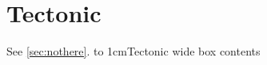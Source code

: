 \documentclass{article}
\begin{document}
\section{Tectonic}\label{sec:t}
See \ref{sec:nothere}.
\undefinedintectonic
\noindent\hbox to 1cm{Tectonic wide box contents}
\end{document}
